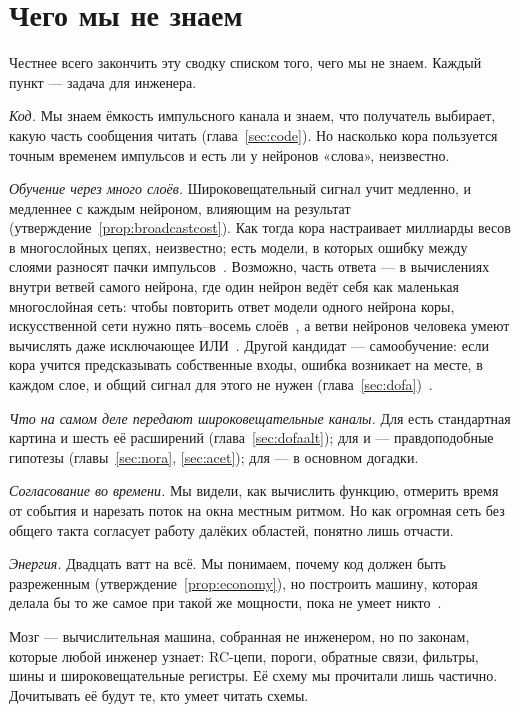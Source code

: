 \section{Чего мы не знаем}

Честнее всего закончить эту сводку списком того, чего мы не знаем. Каждый пункт --- задача для инженера.

\emph{Код.} Мы знаем ёмкость импульсного канала и знаем, что получатель выбирает, какую часть сообщения читать (глава~\ref{sec:code}). Но насколько кора пользуется точным временем импульсов и есть ли у нейронов «слова», неизвестно.

\emph{Обучение через много слоёв.} Широковещательный сигнал учит медленно, и медленнее с каждым нейроном, влияющим на результат (утверждение~\ref{prop:broadcastcost}). Как тогда кора настраивает миллиарды весов в многослойных цепях, неизвестно; есть модели, в которых ошибку между слоями разносят пачки импульсов~\cite{Payeur2021}. Возможно, часть ответа --- в вычислениях внутри ветвей самого нейрона, где один нейрон ведёт себя как маленькая многослойная сеть: чтобы повторить ответ модели одного нейрона коры, искусственной сети нужно пять--восемь слоёв~\cite{Beniaguev2021}, а ветви нейронов человека умеют вычислять даже исключающее ИЛИ~\cite{Gidon2020}. Другой кандидат --- самообучение: если кора учится предсказывать собственные входы, ошибка возникает на месте, в каждом слое, и общий сигнал для этого не нужен (глава~\ref{sec:dofa})~\cite{Keller2018}.

\emph{Что на самом деле передают широковещательные каналы.} Для  есть стандартная картина и шесть её расширений (глава~\ref{sec:dofaalt}); для  и  --- правдоподобные гипотезы (главы~\ref{sec:nora}, \ref{sec:acet}); для  --- в основном догадки.

\emph{Согласование во времени.} Мы видели, как вычислить функцию, отмерить время от события и нарезать поток на окна местным ритмом. Но как огромная сеть без общего такта согласует работу далёких областей, понятно лишь отчасти.

\emph{Энергия.} Двадцать ватт на всё. Мы понимаем, почему код должен быть разреженным (утверждение~\ref{prop:economy}), но построить машину, которая делала бы то же самое при такой же мощности, пока не умеет никто~\cite{MehonicKenyon2022}.

Мозг --- вычислительная машина, собранная не инженером, но по законам, которые любой инженер узнает: RC-цепи, пороги, обратные связи, фильтры, шины и широковещательные регистры. Её схему мы прочитали лишь частично. Дочитывать её будут те, кто умеет читать схемы.
